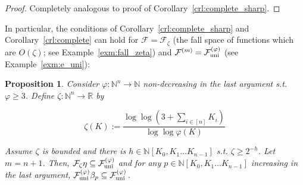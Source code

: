 \documentclass[11pt]{article}
\numberwithin{equation}{section}
\theoremstyle{definition}
\theoremstyle{plain}
\newtheorem{proposition}{Proposition}[section]
\newcommand{\Nats}{\mathbb{N}}
\newcommand{\Reals}{\mathbb{R}}
\newcommand{\NatPoly}{\Nats[K_0, K_1 \ldots K_{n-1}]}
\newcommand{\Fall}{\mathcal{F}}
\newcommand{\FallUt}[1]{{\Fall_{\textnormal{uni}}^{(#1)}}}
\begin{document}
\begin{proof}

Completely analogous to proof of Corollary~\ref{crl:complete_sharp}.
%
\end{proof}

In particular, the conditions of Corollary~\ref{crl:complete_sharp} and Corollary~\ref{crl:complete} can hold for ${\Fall=\Fall_\zeta}$ (the fall space of functions which are $O(\zeta)$; see Example~\ref{exm:fall_zeta}) and ${\Fall^{(m)}=\FallUt{\varphi}}$ (see Example~\ref{exm:e_uni}):

\begin{samepage}
\begin{proposition}

Consider ${\varphi: \Nats^n \rightarrow \Nats}$ non-decreasing in the last argument s.t. ${\varphi \geq 3}$. Define ${\zeta: \Nats^n \rightarrow \Reals}$ by

\begin{equation}
\zeta(K):=\frac{\log \log (3+\sum_{i \in [n]} K_i)}{\log \log \varphi(K)}
\end{equation}

Assume ${\zeta}$ is bounded and there is ${h \in \NatPoly}$ s.t. ${\zeta \geq 2^{-h}}$. Let ${m = n + 1}$. Then, ${\Fall_\zeta \eta \subseteq \FallUt{\varphi}}$ and for any ${p \in \NatPoly}$ increasing in the last argument, ${\FallUt{\varphi} \beta_p \subseteq \FallUt{\varphi}}$.

\end{proposition}
\end{samepage}
\end{document}
